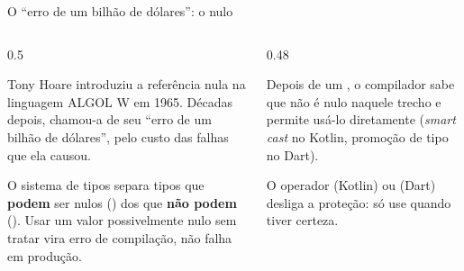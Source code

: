 \begin{frame}{O ``erro de um bilhão de dólares'': o nulo}
  \begin{columns}[T]
    \begin{column}{0.5\textwidth}
      \begin{historia}
        Tony Hoare introduziu a referência nula na linguagem ALGOL W em 1965. Décadas depois, chamou-a de seu ``erro de um bilhão de dólares'', pelo custo das falhas que ela causou.
      \end{historia}
      \begin{definicao}
        O sistema de tipos separa tipos que \textbf{podem} ser nulos () dos que \textbf{não podem} (). Usar um valor possivelmente nulo sem tratar vira erro de compilação, não falha em produção.
      \end{definicao}
    \end{column}
    \begin{column}{0.48\textwidth}
      \centering
      \begin{pordentro}
        Depois de um , o compilador sabe que  não é nulo naquele trecho e permite usá-lo diretamente (\emph{smart cast} no Kotlin, promoção de tipo no Dart).
      \end{pordentro}
      \begin{atencao}
        O operador \cod{!!} (Kotlin) ou \cod{!} (Dart) desliga a proteção: só use quando tiver certeza.
      \end{atencao}
    \end{column}
  \end{columns}
\end{frame}

